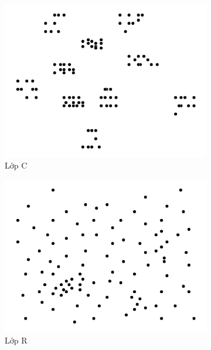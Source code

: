 \begin{figure}[H] %
	\label{fig:perf_ct_c1}
	\begin{subfigure}{.3\textwidth}
		\centering
		\includegraphics[width=1\linewidth]{figures/cls_c.png}
		\caption{Lớp C}
		\label{fig:cls_c}
	\end{subfigure}%
	\begin{subfigure}{.3\textwidth}
		\centering
		\includegraphics[width=1\linewidth]{figures/cls_r.png}
		\caption{Lớp R}
		\label{fig:cls_r}
	\end{subfigure}
	\begin{subfigure}{.3\textwidth}
		\centering

\end{subfigure}
\end{figure}
